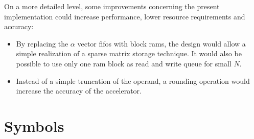 \documentclass[mscthesis]{usiinfthesis}
\begin{document}
On a more detailed level, some improvements concerning the present
implementation could increase performance, lower resource requirements and
accuracy:
\begin{itemize}
    \item By replacing the $\alpha$ vector \glspl{fifo} with block \glspl{ram},
        the design would allow a simple realization of a sparse matrix storage
        technique. It would also be possible to use only one \gls{ram} block as
        read and write queue for small $N$.
    \item Instead of a simple truncation of the operand, a rounding operation
        would increase the accuracy of the accelerator.
\end{itemize}


\appendix %

\chapter{Symbols}
\end{document}
